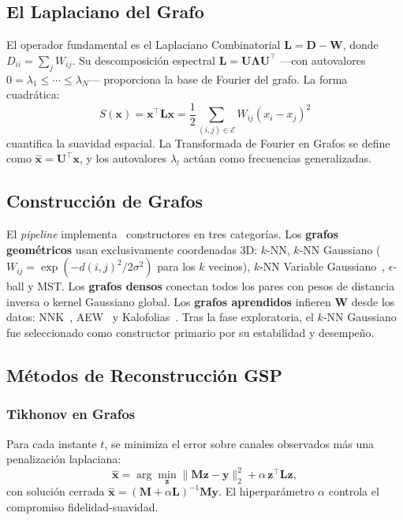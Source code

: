 \subsection{El Laplaciano del Grafo}

El operador fundamental es el Laplaciano Combinatorial $\mathbf{L} = \mathbf{D} - \mathbf{W}$, donde $D_{ii} = \sum_j W_{ij}$. Su descomposición espectral $\mathbf{L} = \mathbf{U} \boldsymbol{\Lambda} \mathbf{U}^\top$ —con autovalores $0 = \lambda_1 \leq \cdots \leq \lambda_N$— proporciona la base de Fourier del grafo. La forma cuadrática:
\begin{equation}
    S(\mathbf{x}) = \mathbf{x}^\top \mathbf{L} \mathbf{x} = \frac{1}{2} \sum_{(i,j) \in \mathcal{E}} W_{ij} (x_i - x_j)^2
    \label{eq:smoothness}
\end{equation}
cuantifica la suavidad espacial. La Transformada de Fourier en Grafos se define como $\hat{\mathbf{x}} = \mathbf{U}^\top \mathbf{x}$, y los autovalores $\lambda_l$ actúan como frecuencias generalizadas.

\subsection{Construcción de Grafos}

El \textit{pipeline} implementa \ResNGraphMethods~constructores en tres categorías. Los \textbf{grafos geométricos} usan exclusivamente coordenadas 3D: $k$-NN, $k$-NN Gaussiano ($W_{ij} = \exp(-d(i,j)^2/2\sigma^2)$ para los $k$ vecinos), $k$-NN Variable Gaussiano~\cite{tamaru_optimizing_2024}, $\epsilon$-ball y MST. Los \textbf{grafos densos} conectan todos los pares con pesos de distancia inversa o kernel Gaussiano global. Los \textbf{grafos aprendidos} infieren $\mathbf{W}$ desde los datos: NNK~\cite{shekkizhar2020}, AEW~\cite{karasuyama_adaptive_2017} y Kalofolias~\cite{kalofolias_how_2016}. Tras la fase exploratoria, el $k$-NN Gaussiano fue seleccionado como constructor primario por su estabilidad y desempeño.

\subsection{Métodos de Reconstrucción GSP}

\subsubsection{Tikhonov en Grafos}

Para cada instante $t$, se minimiza el error sobre canales observados más una penalización laplaciana:
\begin{equation}
    \hat{\mathbf{x}} = \arg\min_{\mathbf{z}} \|\mathbf{M}\mathbf{z} - \mathbf{y}\|_2^2 + \alpha \, \mathbf{z}^\top \mathbf{L} \mathbf{z},
    \label{eq:tikhonov_general}
\end{equation}
con solución cerrada $\hat{\mathbf{x}} = (\mathbf{M} + \alpha \mathbf{L})^{-1} \mathbf{M} \mathbf{y}$. El hiperparámetro $\alpha$ controla el compromiso fidelidad-suavidad.

